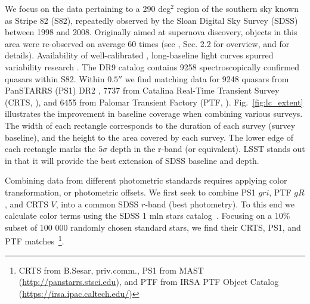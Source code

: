 \documentclass[twocolumn]{aastex62}
\begin{document}
We focus on the data pertaining to a 290 deg$^{2}$ region of the southern sky known as Stripe 82 (S82), repeatedly observed by the Sloan Digital Sky Survey (SDSS) between 1998 and 2008. Originally aimed at supernova discovery, objects in this area were re-observed on average 60 times (see \citealt{macleod2012}, Sec. 2.2 for overview, and \citealt{annis2014} for details). Availability of well-calibrated \citep{ivezic2007}, long-baseline light curves spurred variability research \citep{sesar2007}. The DR9 catalog \citep{schneider2008} contains 9258 spectroscopically confirmed quasars within S82. Within  $0.5 ''$  we find matching data for 9248 quasars from  PanSTARRS (PS1) DR2 \citep{chambers2011,flewelling2018}, 7737 from Catalina Real-Time Transient Survey (CRTS, \citealt{drake2009}), and  6455 from Palomar Transient Factory (PTF, \citealt{rau2009}). Fig.~\ref{fig:lc_extent} illustrates the improvement in baseline coverage when combining various surveys. The width of each rectangle corresponds to the duration of each survey (survey baseline), and the height to the area covered by each survey. The lower edge of each rectangle marks the $5\sigma$ depth in the r-band (or equivalent). LSST stands out in that it will provide the best extension of SDSS baseline and depth.  



\begin{figure*} %
\caption{An illustration of survey baseline, sky area covered, and depth. The width of each rectangle corresponds to the extent of light curves available (or simulated) for Stripe 82 quasars for each survey. For SDSS this means DR7; for CRTS DR2, PS1 DR2, PTF DR2, ZTF year 2018, and LSST the full 10-year survey. The lower edge of each rectangle (marked by a solid thick line) corresponds to the $5\sigma$ limiting magnitude (SDSS $r$, PS1 $r$, PTF $R$, ZTF $r$, LSST $r$, CRTS $V$). The vertical extent corresponds to the total survey area (for SDSS, up to and including DR15).  Note how PS1 and PTF extend the baseline of SDSS by approximately $50\%$, and how inclusion of LSST triples the SDSS baseline. For reference, the area covered by LSST is $25 000$ sq.deg., which corresponds to  $60\%$ of the sky. The whole sky has an area of $4\pi$ steradians (41253 sq.deg.).}
\label{fig:lc_extent}
\end{figure*} 


Combining data from different photometric standards requires applying color transformation, or photometric offsets. We first seek to combine PS1 $gri$,  PTF $gR$, and CRTS $V$, into a common SDSS $r$-band (best photometry). To this end we calculate  color terms using the SDSS 1 mln stars catalog~\citep{ivezic2007}. Focusing on a 10\% subset of 100 000 randomly chosen standard stars, we find their CRTS, PS1, and PTF matches~\footnote{CRTS from B.Sesar, priv.comm., PS1 from MAST (\url{http://panstarrs.stsci.edu}), and PTF from IRSA PTF Object Catalog (\url{https://irsa.ipac.caltech.edu/})}. 
\end{document}
